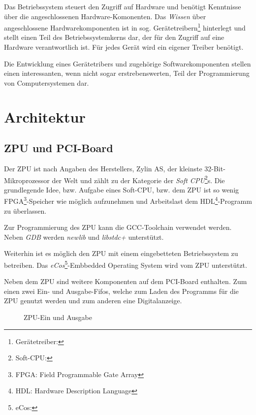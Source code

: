 \documentclass[12pt]{scrartcl}
\begin{document}
Das Betriebssystem steuert den Zugriff auf Hardware und benötigt Kenntnisse über die angeschlossenen Hardware-Komonenten. Das \textit{Wissen} über angeschlossene Hardwarekomponenten ist in sog. Gerätetreibern\footnote{Gerätetreiber:} hinterlegt und stellt einen Teil des Betriebssystemkerns dar, der für den Zugriff auf eine Hardware verantwortlich ist. Für jedes Gerät wird ein eigener Treiber benötigt.%

Die Entwicklung eines Gerätetribers und zugehörige Softwarekomponenten stellen einen interessanten, wenn nicht sogar erstrebenswerten, Teil der Programmierung von Computersystemen dar.

\pagebreak

\section{Architektur}
 
\subsection{ZPU und PCI-Board}
Der ZPU ist nach Angaben des Herstellers, Zylin AS, der kleinste 32-Bit-Mikroprozessor der Welt und zählt zu der Kategorie der \textit{Soft CPU}\footnote{Soft-CPU:}s. Die grundlegende Idee, bzw. Aufgabe eines Soft-CPU, bzw. dem ZPU ist so wenig FPGA\footnote{FPGA: Field Programmable Gate Array}-Speicher wie möglich aufzunehmen und Arbeitslast dem HDL\footnote{HDL: Hardware Description Language}-Programm zu überlassen.

Zur Programmierung des ZPU kann die GCC-Toolchain verwendet werden. Neben \textit{GDB} werden \textit{newlib} und \textit{libstdc+} unterstützt.

Weiterhin ist es möglich den ZPU mit einem eingebetteten Betriebssystem zu betreiben. Das \textit{eCos}\footnote{eCos:}-Embbedded Operating System wird vom ZPU unterstützt. 

Neben dem ZPU sind weitere Komponenten auf dem PCI-Board enthalten. Zum einen zwei Ein- und Ausgabe-Fifos, welche zum Laden des Programms für die ZPU genutzt werden und zum anderen eine Digitalanzeige. 
\begin{figure}[!htb]
	\begin{center}
		
		\caption{ZPU-Ein und Ausgabe}
		\label{zpu_io}
	\end{center}
\end{figure}
\end{document}
